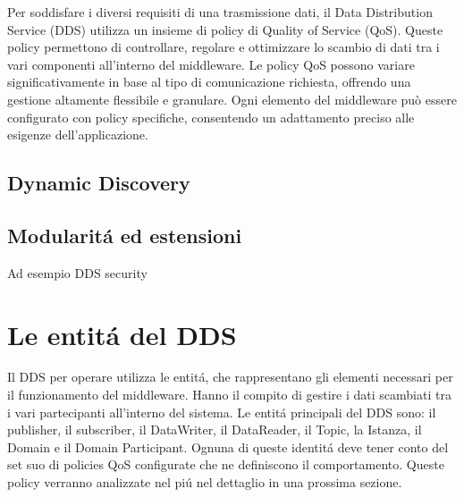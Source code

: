 Per soddisfare i diversi requisiti di una trasmissione dati, 
il Data Distribution Service (DDS) utilizza un insieme di policy di 
Quality of Service (QoS). Queste policy permettono di controllare, 
regolare e ottimizzare lo scambio di dati tra i vari componenti 
all'interno del middleware. Le policy QoS possono variare 
significativamente in base al tipo di comunicazione richiesta, 
offrendo una gestione altamente flessibile e granulare. 
Ogni elemento del middleware può essere configurato 
con policy specifiche, consentendo un adattamento preciso alle 
esigenze dell'applicazione.

\subsection{Dynamic Discovery}


\subsection{Modularitá ed estensioni}
Ad esempio DDS security







\section{Le entitá del DDS}
Il DDS per operare utilizza le entitá, che rappresentano gli elementi necessari
per il funzionamento del middleware. Hanno il compito di gestire i dati
scambiati tra i vari partecipanti all'interno del sistema. 
Le entitá principali del DDS sono: 
il publisher, il subscriber, il DataWriter, il DataReader, il Topic,
la Istanza, il Domain e il Domain Participant.
Ognuna di queste identitá deve tener conto del set suo di policies QoS configurate
che ne definiscono il comportamento. Queste policy verranno analizzate 
nel piú nel dettaglio in una prossima sezione.

